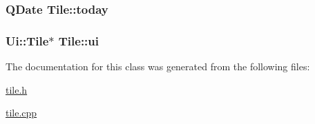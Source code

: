 \subsubsection[{\texorpdfstring{today}{today}}]{\setlength{\rightskip}{0pt plus 5cm}Q\+Date Tile\+::today\hspace{0.3cm}{\ttfamily [private]}}\hypertarget{classTile_a8f78174bdd6633fd6bd32221a7309136}{}\label{classTile_a8f78174bdd6633fd6bd32221a7309136}
\subsubsection[{\texorpdfstring{ui}{ui}}]{\setlength{\rightskip}{0pt plus 5cm}Ui\+::\+Tile$\ast$ Tile\+::ui}\hypertarget{classTile_af9b10613aac7f5cbffac5ff7d17937d7}{}\label{classTile_af9b10613aac7f5cbffac5ff7d17937d7}


The documentation for this class was generated from the following files\+:\begin{DoxyCompactItemize}
\item 
\hyperlink{tile_8h}{tile.\+h}\item 
\hyperlink{tile_8cpp}{tile.\+cpp}\end{DoxyCompactItemize}
